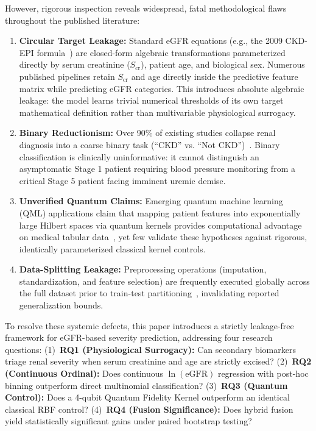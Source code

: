 \documentclass[10pt,conference]{IEEEtran}
\begin{document}
However, rigorous inspection reveals widespread, fatal methodological flaws throughout the published literature:
\begin{enumerate}
    \item \textbf{Circular Target Leakage:} Standard eGFR equations (e.g., the 2009 CKD-EPI formula~\cite{levey2009new}) are closed-form algebraic transformations parameterized directly by serum creatinine ($S_{\text{cr}}$), patient age, and biological sex. Numerous published pipelines retain $S_{\text{cr}}$ and age directly inside the predictive feature matrix while predicting eGFR categories. This introduces absolute algebraic leakage: the model learns trivial numerical thresholds of its own target mathematical definition rather than multivariable physiological surrogacy.
    \item \textbf{Binary Reductionism:} Over 90\% of existing studies collapse renal diagnosis into a coarse binary task (``CKD'' vs. ``Not CKD'')~\cite{boukenze2016predicting, chittora2021efficient, misir2022performance}. Binary classification is clinically uninformative: it cannot distinguish an asymptomatic Stage 1 patient requiring blood pressure monitoring from a critical Stage 5 patient facing imminent uremic demise.
    \item \textbf{Unverified Quantum Claims:} Emerging quantum machine learning (QML) applications claim that mapping patient features into exponentially large Hilbert spaces via quantum kernels provides computational advantage on medical tabular data~\cite{schuld2019quantum, havricek2019supervised}, yet few validate these hypotheses against rigorous, identically parameterized classical kernel controls.
    \item \textbf{Data-Splitting Leakage:} Preprocessing operations (imputation, standardization, and feature selection) are frequently executed globally across the full dataset prior to train-test partitioning~\cite{senan2021machine}, invalidating reported generalization bounds.
\end{enumerate}

To resolve these systemic defects, this paper introduces a strictly leakage-free framework for eGFR-based severity prediction, addressing four research questions: (1)~\textbf{RQ1 (Physiological Surrogacy):} Can secondary biomarkers triage renal severity when serum creatinine and age are strictly excised? (2)~\textbf{RQ2 (Continuous Ordinal):} Does continuous $\ln(\text{eGFR})$ regression with post-hoc binning outperform direct multinomial classification? (3)~\textbf{RQ3 (Quantum Control):} Does a 4-qubit Quantum Fidelity Kernel outperform an identical classical RBF control? (4)~\textbf{RQ4 (Fusion Significance):} Does hybrid fusion yield statistically significant gains under paired bootstrap testing?
\end{document}
